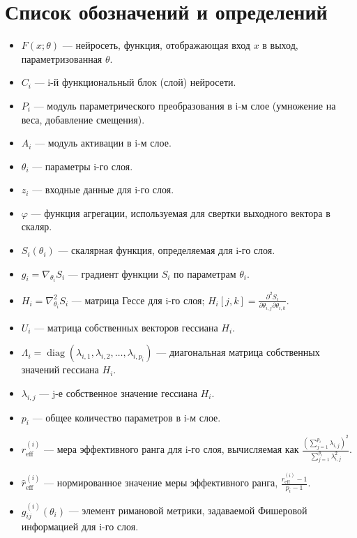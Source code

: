 \documentclass[a4paper,12pt]{article}
\begin{document}
\newpage

\section*{Список обозначений и определений}

\begin{itemize}
    \item \(F(x;\theta)\) --- нейросеть, функция, отображающая вход \(x\) в выход, параметризованная \(\theta\).
    \item \(C_i\) --- i-й функциональный блок (слой) нейросети.
    \item \(P_i\) --- модуль параметрического преобразования в i-м слое (умножение на веса, добавление смещения).
    \item \(A_i\) --- модуль активации в i-м слое.
    \item \(\theta_i\) --- параметры i-го слоя.
    \item \(z_i\) --- входные данные для i-го слоя.
    \item \(\varphi\) --- функция агрегации, используемая для свертки выходного вектора в скаляр.
    \item \(S_i(\theta_i)\) --- скалярная функция, определяемая для i-го слоя.
    \item \(g_i = \nabla_{\theta_i} S_i\) --- градиент функции \(S_i\) по параметрам \(\theta_i\).
    \item \(H_i = \nabla^2_{\theta_i} S_i\) --- матрица Гессе для i-го слоя; \(H_i[j,k] = \frac{\partial^2 S_i}{\partial \theta_{i,j}\partial \theta_{i,k}}\).
    \item \(U_i\) --- матрица собственных векторов гессиана \(H_i\).
    \item \(\Lambda_i = \operatorname{diag}(\lambda_{i,1}, \lambda_{i,2}, \dots, \lambda_{i,p_i})\) --- диагональная матрица собственных значений гессиана \(H_i\).
    \item \(\lambda_{i,j}\) --- j-е собственное значение гессиана \(H_i\).
    \item \(p_i\) --- общее количество параметров в i-м слое.
    \item \(r_{\text{eff}}^{(i)}\) --- мера эффективного ранга для i-го слоя, вычисляемая как \(\frac{\left(\sum_{j=1}^{p_i} \lambda_{i,j}\right)^2}{\sum_{j=1}^{p_i}\lambda_{i,j}^2}\).
    \item \(\hat{r}_{\text{eff}}^{(i)}\) --- нормированное значение меры эффективного ранга, \(\frac{r_{\text{eff}}^{(i)} - 1}{p_i - 1}\).
    \item \(g^{(i)}_{ij}(\theta_i)\) --- элемент римановой метрики, задаваемой Фишеровой информацией для i-го слоя.

\end{itemize}
\end{document}
